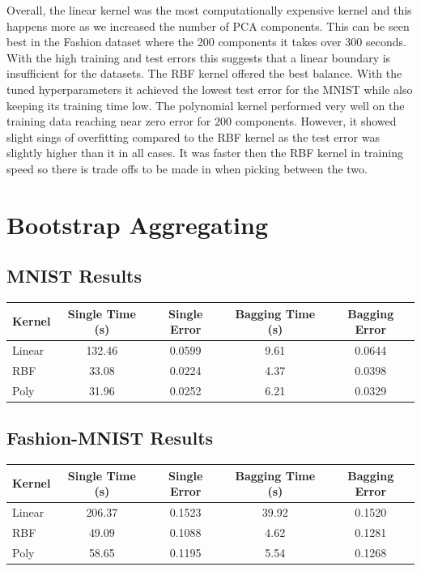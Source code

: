 \documentclass{article}
\begin{document}
Overall, the linear kernel was the most computationally expensive kernel and this happens more as we increased the number of PCA components. This can be seen best in the Fashion dataset where the 200 components it takes over 300 seconds. With the high training and test errors this suggests that a linear boundary is insufficient for the datasets. The RBF kernel offered the best balance. With the tuned hyperparameters it achieved the lowest test error for the MNIST while also keeping its training time low. The polynomial kernel performed very well on the training data reaching near zero error for 200 components. However, it showed slight sings of overfitting compared to the RBF kernel as the test error was slightly higher than it in all cases. It was faster then the RBF kernel in training speed so there is trade offs to be made in when picking between the two.

\section{Bootstrap Aggregating}

\subsection*{MNIST Results}

\begin{center}
\begin{tabular}{lcccc}
\toprule
Kernel & Single Time (s) & Single Error & Bagging Time (s) & Bagging Error \\
\midrule
Linear & 132.46 & 0.0599 & 9.61 & 0.0644 \\
RBF    & 33.08 & 0.0224 &  4.37 & 0.0398 \\
Poly   & 31.96  & 0.0252 & 6.21 & 0.0329 \\
\bottomrule
\end{tabular}
\end{center}

\subsection*{Fashion-MNIST Results}

\begin{center}
\begin{tabular}{lcccc}
\toprule
Kernel & Single Time (s) & Single Error & Bagging Time (s) & Bagging Error \\
\midrule
Linear & 206.37 & 0.1523 & 39.92 & 0.1520 \\
RBF    & 49.09 & 0.1088 & 4.62 & 0.1281 \\
Poly   & 58.65  & 0.1195 & 5.54 & 0.1268 \\
\bottomrule
\end{tabular}
\end{center}
\end{document}
